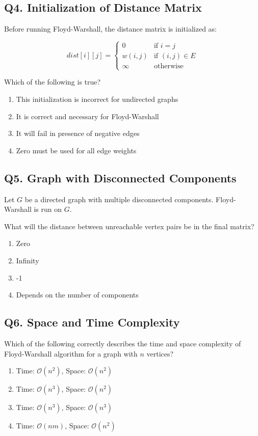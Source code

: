 \subsection*{Q4. Initialization of Distance Matrix}
Before running Floyd-Warshall, the distance matrix is initialized as:

\[
dist[i][j] = 
\begin{cases}
0 & \text{if } i = j \\
w(i, j) & \text{if } (i, j) \in E \\
\infty & \text{otherwise}
\end{cases}
\]

Which of the following is true?

\begin{enumerate}[label=(\alph*)]
    \item This initialization is incorrect for undirected graphs
    \item It is correct and necessary for Floyd-Warshall
    \item It will fail in presence of negative edges
    \item Zero must be used for all edge weights
\end{enumerate}

\subsection*{Q5. Graph with Disconnected Components}
Let $G$ be a directed graph with multiple disconnected components. Floyd-Warshall is run on $G$.

What will the distance between unreachable vertex pairs be in the final matrix?

\begin{enumerate}[label=(\alph*)]
    \item Zero
    \item Infinity
    \item -1
    \item Depends on the number of components
\end{enumerate}

\subsection*{Q6. Space and Time Complexity}
Which of the following correctly describes the time and space complexity of Floyd-Warshall algorithm for a graph with $n$ vertices?

\begin{enumerate}[label=(\alph*)]
    \item Time: $\mathcal{O}(n^2)$, Space: $\mathcal{O}(n^2)$
    \item Time: $\mathcal{O}(n^3)$, Space: $\mathcal{O}(n^2)$
    \item Time: $\mathcal{O}(n^3)$, Space: $\mathcal{O}(n^3)$
    \item Time: $\mathcal{O}(nm)$, Space: $\mathcal{O}(n^2)$
\end{enumerate}

